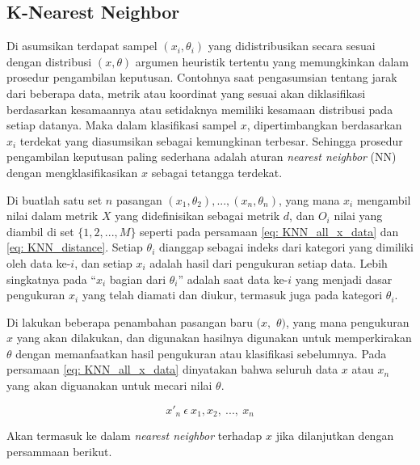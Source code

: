 \subsection{K-Nearest Neighbor}
\label{sec:sub_sec2_knn}
\vspace{1ex}

Di asumsikan terdapat sampel $(x_{i}, \theta_{i})$ yang didistribusikan secara sesuai dengan distribusi $(x, \theta)$ argumen heuristik tertentu yang memungkinkan dalam prosedur pengambilan keputusan. Contohnya saat pengasumsian tentang jarak dari beberapa data, metrik atau koordinat yang sesuai akan diklasifikasi berdasarkan kesamaannya atau setidaknya memiliki kesamaan distribusi pada setiap datanya. Maka dalam klasifikasi sampel $x$, dipertimbangkan berdasarkan $x_{i}$ terdekat yang diasumsikan sebagai kemungkinan terbesar. Sehingga prosedur pengambilan keputusan paling sederhana adalah aturan \textit{nearest neighbor} (NN) dengan mengklasifikasikan $x$ sebagai tetangga terdekat.
\vspace{1ex}

Di buatlah satu set $n$ pasangan $(x_{1}, \theta_{2}), ..., (x_{n}, \theta_{n})$, yang mana $x_{i}$ mengambil nilai dalam metrik $X$ yang didefinisikan sebagai metrik $d$, dan $O_{i}$ nilai yang diambil di set $\{1, 2, ..., M\}$ seperti pada persamaan \ref{eq: KNN_all_x_data} dan \ref{eq: KNN_distance}. Setiap $\theta_{i}$ dianggap sebagai indeks dari kategori yang dimiliki oleh data ke-$i$, dan setiap $x_{i}$ adalah hasil dari pengukuran setiap data. Lebih singkatnya pada ``$x_{i}$ bagian dari $\theta_{i}$'' adalah saat data ke-$i$ yang menjadi dasar pengukuran $x_{i}$ yang telah diamati dan diukur, termasuk juga pada kategori $\theta_{i}$.
\vspace{1ex}

Di lakukan beberapa penambahan pasangan baru $(x,$ $\theta)$, yang mana pengukuran $x$ yang akan dilakukan, dan digunakan hasilnya digunakan untuk memperkirakan $\theta$ dengan memanfaatkan hasil pengukuran atau klasifikasi sebelumnya. Pada persamaan \ref{eq: KNN_all_x_data} dinyatakan bahwa seluruh data $x$ atau $x_{n}$ yang akan diguanakan untuk mecari nilai $\theta$.

\begin{equation}\label{eq: KNN_all_x_data}
x'_{n}\ \epsilon\ x_{1}, x_{2},\ ...,\ x_{n}
\end{equation}

\noindent Akan termasuk ke dalam \textit{nearest neighbor} terhadap $x$ jika dilanjutkan dengan persammaan berikut.

